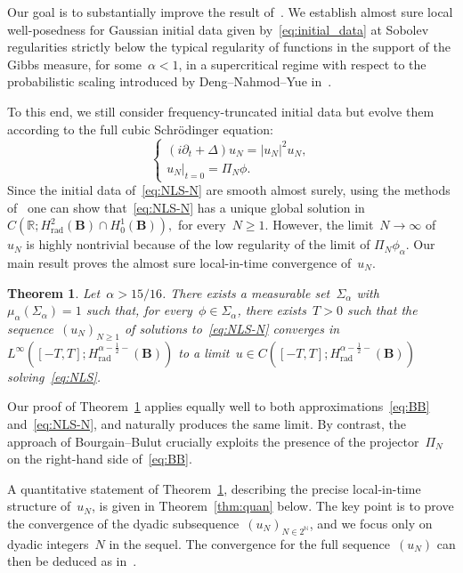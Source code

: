 \documentclass[11pt,reqno,english]{amsart}
\numberwithin{equation}{section}
\theoremstyle{plain}
\newtheorem{theorem}{Theorem}[section]
\theoremstyle{definition}
\theoremstyle{remark}
\newcommand{\R}{\mathbb{R}}
\begin{document}
Our goal is to substantially improve the result of~\cite{BB14}.
We establish almost sure local well-posedness for Gaussian initial data given by~\eqref{eq:initial_data} at Sobolev regularities strictly below the typical regularity of functions in the support of the Gibbs measure, for some~$\alpha < 1$, in a supercritical regime with respect to the probabilistic scaling introduced by Deng--Nahmod--Yue in~\cite{DNY24,DNY22}.

To this end, we still consider frequency-truncated initial data but evolve them according to the full
cubic Schrödinger equation:
\begin{equation}
	\label{eq:NLS-N}
	\begin{cases}
		(i\partial_{t}+\Delta)u_{N}
		= |u_{N}|^{2}u_{N},\\
		u_{N}|_{t=0}
		= \Pi_{N}\phi.
	\end{cases}
\end{equation}
Since the initial data of~\eqref{eq:NLS-N} are smooth almost surely,
using the methods of~\cite{Tzv08} one can show that~\eqref{eq:NLS-N} has a unique global solution
in
$
C(\R;H_\mathrm{rad}^2(\mathbf{B})\cap H^1_0(\mathbf{B})),
$
for every~$N\geq 1$. However, the limit~$N\to\infty$ of~$u_N$ is highly nontrivial because of the low regularity of the limit of
$\Pi_{N}\phi_\alpha$.
Our main result proves the almost sure local-in-time convergence of~$u_N$.
\begin{theorem}
	\label{thm:main1}
	Let~$\alpha>15/16$. There exists a measurable set~$\Sigma_{\alpha}$ with~$\mu_{\alpha}(\Sigma_{\alpha})=1$ such that, for every~$\phi\in\Sigma_{\alpha}$, there exists~$T>0$ such that the sequence~$(u_{N})_{N\geq1}$ of solutions to~\eqref{eq:NLS-N}
	converges in
	$L^{\infty}([-T,T];H_\mathrm{rad}^{\alpha-\frac12-}(\mathbf{B}))$
	to a limit~$u\in C([-T,T];H_\mathrm{rad}^{\alpha-\frac12-}(\mathbf{B}))$ solving~\eqref{eq:NLS}.
\end{theorem}
Our proof of Theorem~\ref{thm:main1} applies equally well to both approximations~\eqref{eq:BB} and~\eqref{eq:NLS-N}, and naturally produces the same limit. By contrast, the approach of Bourgain--Bulut crucially exploits the presence of the projector~$\Pi_{N}$ on the right-hand side of~\eqref{eq:BB}.

A quantitative statement of Theorem~\ref{thm:main1}, describing the precise local-in-time structure of~$u_{N}$, is given in Theorem~\ref{thm:quan} below. The key point is to prove the convergence of the dyadic subsequence~$(u_N)_{N\in 2^{\mathbb{N}}}$, and we focus only on dyadic integers~$N$ in the sequel.
The convergence for the full sequence~$(u_{N})$ can then be deduced as in~\cite{DNY24,BCST24}.
\end{document}
